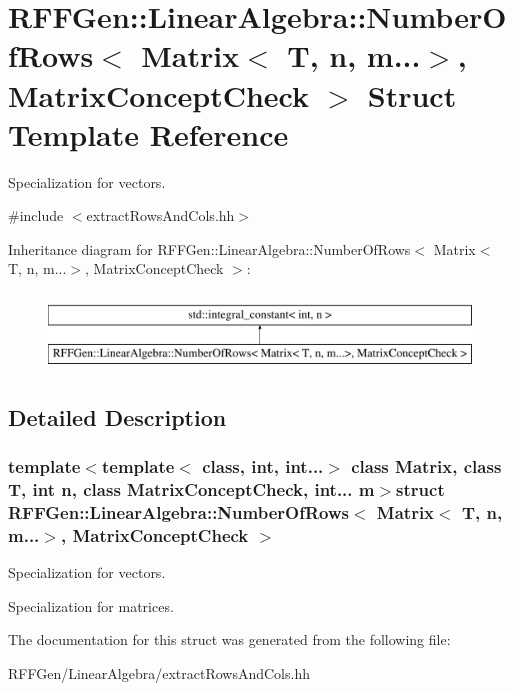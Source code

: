 \hypertarget{structRFFGen_1_1LinearAlgebra_1_1NumberOfRows_3_01Matrix_3_01T_00_01n_00_01m_8_8_8_4_00_01MatrixConceptCheck_01_4}{\section{R\-F\-F\-Gen\-:\-:Linear\-Algebra\-:\-:Number\-Of\-Rows$<$ Matrix$<$ T, n, m...$>$, Matrix\-Concept\-Check $>$ Struct Template Reference}
\label{structRFFGen_1_1LinearAlgebra_1_1NumberOfRows_3_01Matrix_3_01T_00_01n_00_01m_8_8_8_4_00_01MatrixConceptCheck_01_4}
}


Specialization for vectors.  




{\ttfamily \#include $<$extract\-Rows\-And\-Cols.\-hh$>$}

Inheritance diagram for R\-F\-F\-Gen\-:\-:Linear\-Algebra\-:\-:Number\-Of\-Rows$<$ Matrix$<$ T, n, m...$>$, Matrix\-Concept\-Check $>$\-:\begin{figure}[H]
\begin{center}
\leavevmode
\includegraphics[height=2.000000cm]{structRFFGen_1_1LinearAlgebra_1_1NumberOfRows_3_01Matrix_3_01T_00_01n_00_01m_8_8_8_4_00_01MatrixConceptCheck_01_4}
\end{center}
\end{figure}


\subsection{Detailed Description}
\subsubsection*{template$<$template$<$ class, int, int...$>$ class Matrix, class T, int n, class Matrix\-Concept\-Check, int... m$>$struct R\-F\-F\-Gen\-::\-Linear\-Algebra\-::\-Number\-Of\-Rows$<$ Matrix$<$ T, n, m...$>$, Matrix\-Concept\-Check $>$}

Specialization for vectors. 

Specialization for matrices. 

The documentation for this struct was generated from the following file\-:\begin{DoxyCompactItemize}
\item 
R\-F\-F\-Gen/\-Linear\-Algebra/extract\-Rows\-And\-Cols.\-hh\end{DoxyCompactItemize}
